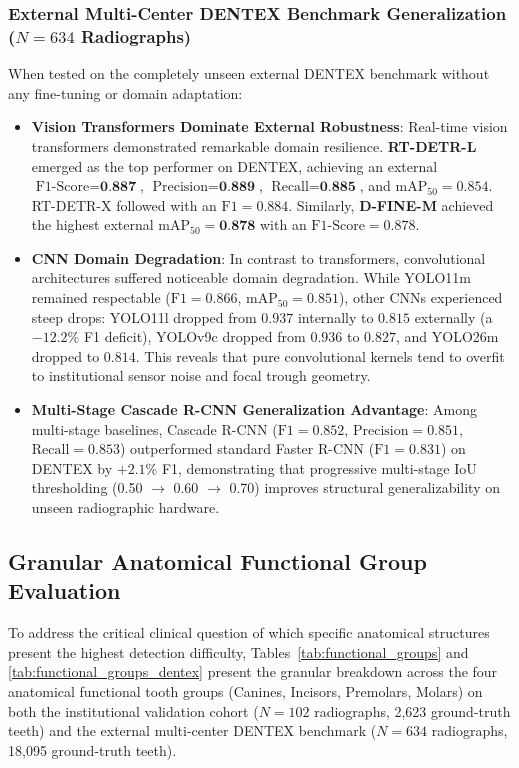 \documentclass[10pt,journal,compsoc]{IEEEtran}
\begin{document}
\subsubsection{External Multi-Center DENTEX Benchmark Generalization (\texorpdfstring{$N=634$}{N=634} Radiographs)}
When tested on the completely unseen external DENTEX benchmark without any fine-tuning or domain adaptation:
\begin{itemize}
    \item \textbf{Vision Transformers Dominate External Robustness}: Real-time vision transformers demonstrated remarkable domain resilience. \textbf{RT-DETR-L} emerged as the top performer on DENTEX, achieving an external $\text{F1-Score} = \textbf{0.887}$, $\text{Precision} = \textbf{0.889}$, $\text{Recall} = \textbf{0.885}$, and $\text{mAP}_{50} = 0.854$. RT-DETR-X followed with an $\text{F1} = 0.884$. Similarly, \textbf{D-FINE-M} achieved the highest external $\text{mAP}_{50} = \textbf{0.878}$ with an $\text{F1-Score} = 0.878$.
    \item \textbf{CNN Domain Degradation}: In contrast to transformers, convolutional architectures suffered noticeable domain degradation. While YOLO11m remained respectable ($\text{F1} = 0.866$, $\text{mAP}_{50} = 0.851$), other CNNs experienced steep drops: YOLO11l dropped from $0.937$ internally to $0.815$ externally (a $-12.2\%$ F1 deficit), YOLOv9c dropped from $0.936$ to $0.827$, and YOLO26m dropped to $0.814$. This reveals that pure convolutional kernels tend to overfit to institutional sensor noise and focal trough geometry.
    \item \textbf{Multi-Stage Cascade R-CNN Generalization Advantage}: Among multi-stage baselines, Cascade R-CNN ($\text{F1} = 0.852$, $\text{Precision} = 0.851$, $\text{Recall} = 0.853$) outperformed standard Faster R-CNN ($\text{F1} = 0.831$) on DENTEX by $+2.1\%$ F1, demonstrating that progressive multi-stage IoU thresholding (0.50 $\rightarrow$ 0.60 $\rightarrow$ 0.70) improves structural generalizability on unseen radiographic hardware.
\end{itemize}

\subsection{Granular Anatomical Functional Group Evaluation}
To address the critical clinical question of which specific anatomical structures present the highest detection difficulty, Tables~\ref{tab:functional_groups} and \ref{tab:functional_groups_dentex} present the granular breakdown across the four anatomical functional tooth groups (Canines, Incisors, Premolars, Molars) on both the institutional validation cohort ($N=102$ radiographs, 2,623 ground-truth teeth) and the external multi-center DENTEX benchmark ($N=634$ radiographs, 18,095 ground-truth teeth).
\end{document}
